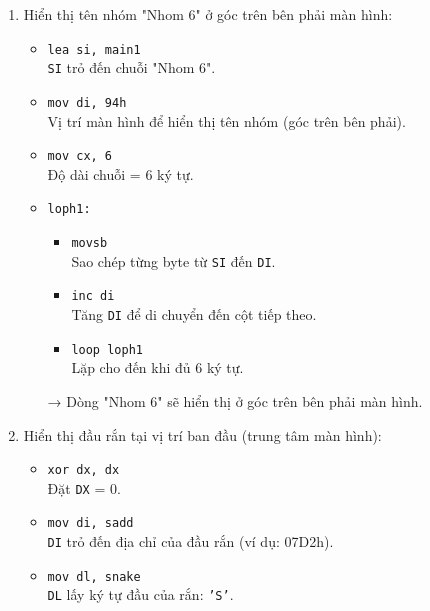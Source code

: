 \documentclass[12pt]{article}
\begin{document}
\begin{enumerate}[label=\textbf{\arabic*.}]
    \item Hiển thị tên nhóm "Nhom 6" ở góc trên bên phải màn hình:
    
    \begin{itemize}
        \item \texttt{lea si, main1} \\
        \texttt{SI} trỏ đến chuỗi "Nhom 6".
        
        \item \texttt{mov di, 94h} \\
        Vị trí màn hình để hiển thị tên nhóm (góc trên bên phải).
        
        \item \texttt{mov cx, 6} \\
        Độ dài chuỗi = 6 ký tự.
        
        \item \texttt{loph1:}
        \begin{itemize}
            \item \texttt{movsb} \\
            Sao chép từng byte từ \texttt{SI} đến \texttt{DI}.
            \item \texttt{inc di} \\
            Tăng \texttt{DI} để di chuyển đến cột tiếp theo.
            \item \texttt{loop loph1} \\
            Lặp cho đến khi đủ 6 ký tự.
        \end{itemize}
        → Dòng "Nhom 6" sẽ hiển thị ở góc trên bên phải màn hình.
    \end{itemize}

    \item Hiển thị đầu rắn tại vị trí ban đầu (trung tâm màn hình):
    
    \begin{itemize}
        \item \texttt{xor dx, dx} \\
        Đặt \texttt{DX} = 0.
        
        \item \texttt{mov di, sadd} \\
        \texttt{DI} trỏ đến địa chỉ của đầu rắn (ví dụ: 07D2h).
        
        \item \texttt{mov dl, snake} \\
        \texttt{DL} lấy ký tự đầu của rắn: \texttt{'S'}.
        

\end{itemize}
\end{enumerate}
\end{document}

